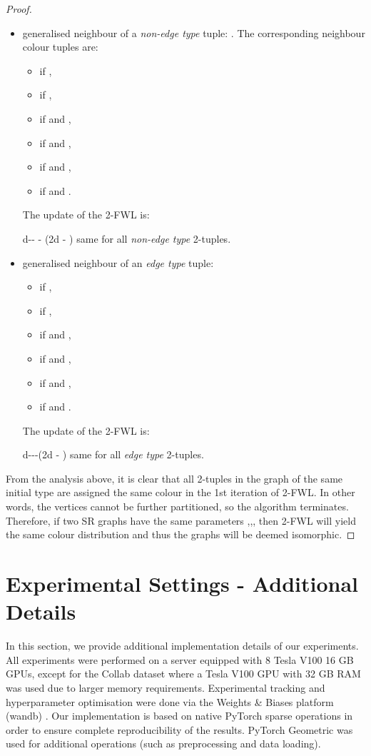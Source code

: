 \begin{proof}
\begin{itemize}
    \item generalised neighbour of a \textit{non-edge type} tuple: . The corresponding neighbour colour tuples are:
    \begin{itemize}
        \item  if ,  
        \item  if , 
        \item  if  and , 
        \item  if  and , 
        \item  if  and , 
        \item  if  and .
    \end{itemize}
     The update of the 2-FWL is:
     
     d-\mud- - (2d - \mu)\mu
same for all \textit{non-edge type} 2-tuples.

    
    \item generalised neighbour of an \textit{edge type} tuple:  
    \begin{itemize}
        \item  if , 
        \item  if , 
        \item  if  and , 
        \item  if  and , 
        \item  if  and , 
        \item  if  and .
    \end{itemize}
    The update of the 2-FWL is:
     
     d-\lambdad--(2d - \lambda)\lambda
same for all \textit{edge type} 2-tuples.
\end{itemize}

From the analysis above, it is clear that all 2-tuples in the graph of the same initial type are assigned the same colour in the 1st iteration of 2-FWL. In other words, the vertices cannot be further partitioned, so the algorithm terminates. Therefore, if two SR graphs have the same parameters ,,, then 2-FWL will yield the same colour distribution and thus the graphs will be deemed isomorphic.

\end{proof}

\section{Experimental Settings - Additional Details}\label{experiments_supp}

In this section, we provide additional implementation details of our experiments. All experiments were performed on a server equipped with 8 Tesla V100 16 GB GPUs, except for the Collab dataset where a Tesla V100 GPU with 32 GB RAM was used due to larger memory requirements.
Experimental tracking and hyperparameter optimisation were done via the Weights \& Biases platform (wandb) \cite{wandb}. Our implementation is based on native PyTorch sparse operations \cite{paszke2019pytorch} in order to ensure complete reproducibility of the results. PyTorch Geometric \cite{DBLP:journals/corr/abs-1903-02428} was used for additional operations (such as preprocessing and data loading).

